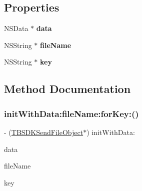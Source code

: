 \subsection*{Properties}
\begin{DoxyCompactItemize}
\item 
\mbox{\label{interface_t_b_s_d_k_send_file_object_ad3502889daf432216a92e4e3fefacad6}} 
N\+S\+Data $\ast$ {\bfseries data}
\item 
\mbox{\label{interface_t_b_s_d_k_send_file_object_a10b6f75c6deb7fe4b4fe7a96c8981a56}} 
N\+S\+String $\ast$ {\bfseries file\+Name}
\item 
\mbox{\label{interface_t_b_s_d_k_send_file_object_ae7dfb5a068d30d2a95447a57c3442da9}} 
N\+S\+String $\ast$ {\bfseries key}
\end{DoxyCompactItemize}


\subsection{Method Documentation}
\mbox{\label{interface_t_b_s_d_k_send_file_object_a5f357fb7f1c5d157f37c70f1494c46a4}} 
\subsubsection{\texorpdfstring{init\+With\+Data\+:file\+Name\+:for\+Key\+:()}{initWithData:fileName:forKey:()}}
{\footnotesize\ttfamily -\/ (\mbox{\hyperlink{interface_t_b_s_d_k_send_file_object}{T\+B\+S\+D\+K\+Send\+File\+Object}}$\ast$) init\+With\+Data\+: \begin{DoxyParamCaption}\item[{(N\+S\+Data $\ast$)}]{data }\item[{fileName:(N\+S\+String $\ast$)}]{file\+Name }\item[{forKey:(N\+S\+String $\ast$)}]{key }\end{DoxyParamCaption}}

